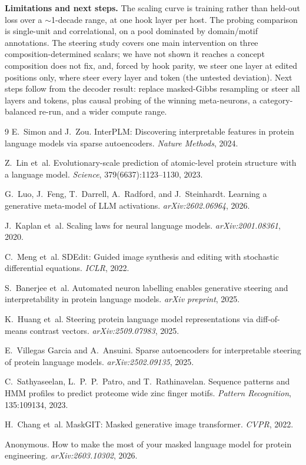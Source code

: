 \documentclass{article}
\begin{document}
\medskip
\noindent\textbf{Limitations and next steps.} The scaling curve is training rather than
held-out loss over a $\sim$1-decade range, at one hook layer per host. The probing comparison
is single-unit and correlational, on a pool dominated by domain/motif annotations. The steering
study covers one main intervention on three composition-determined scalars; we have not shown it
reaches a concept composition does not fix, and, forced by hook parity, we steer one layer at
edited positions only, where \cite{huang2025diffmean} steer every layer and token
(the untested deviation). Next steps follow from the decoder result: replace masked-Gibbs
resampling or steer all layers and tokens, plus causal probing of the winning meta-neurons, a
category-balanced re-run, and a wider compute range.

\begin{thebibliography}{9}
\small
{}
E.~Simon and J.~Zou.
\newblock InterPLM: Discovering interpretable features in protein language models via
sparse autoencoders.
\newblock \emph{Nature Methods}, 2024.

Z.~Lin et~al.
\newblock Evolutionary-scale prediction of atomic-level protein structure with a
language model.
\newblock \emph{Science}, 379(6637):1123--1130, 2023.

G.~Luo, J.~Feng, T.~Darrell, A.~Radford, and J.~Steinhardt.
\newblock Learning a generative meta-model of LLM activations.
\newblock \emph{arXiv:2602.06964}, 2026.

J.~Kaplan et~al.
\newblock Scaling laws for neural language models.
\newblock \emph{arXiv:2001.08361}, 2020.

C.~Meng et~al.
\newblock SDEdit: Guided image synthesis and editing with stochastic differential
equations.
\newblock \emph{ICLR}, 2022.

S.~Banerjee et~al.
\newblock Automated neuron labelling enables generative steering and interpretability in
protein language models.
\newblock \emph{arXiv preprint}, 2025.

K.~Huang et~al.
\newblock Steering protein language model representations via diff-of-means contrast
vectors.
\newblock \emph{arXiv:2509.07983}, 2025.

E.~Villegas Garcia and A.~Ansuini.
\newblock Sparse autoencoders for interpretable steering of protein language models.
\newblock \emph{arXiv:2502.09135}, 2025.

C.~Sathyaseelan, L.~P.~P.~Patro, and T.~Rathinavelan.
\newblock Sequence patterns and HMM profiles to predict proteome wide zinc finger motifs.
\newblock \emph{Pattern Recognition}, 135:109134, 2023.

H.~Chang et~al.
\newblock MaskGIT: Masked generative image transformer.
\newblock \emph{CVPR}, 2022.

Anonymous.
\newblock How to make the most of your masked language model for protein engineering.
\newblock \emph{arXiv:2603.10302}, 2026.
\end{thebibliography}
\end{document}
